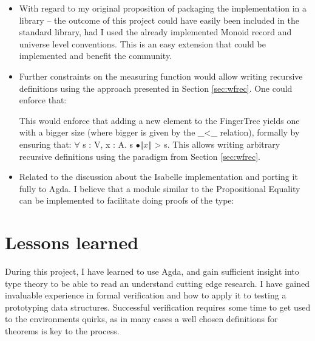 \documentclass[12pt,twoside,notitlepage]{report}
\begin{document}
\begin{itemize}

\item With regard to my original proposition of packaging the implementation in a library -- the outcome of this project could have easily been included in the standard library, had I used the already implemented Monoid record and universe level conventions. This is an easy extension that could be implemented and benefit the community.

\item Further constraints on the measuring function would allow writing recursive definitions using the approach presented in Section \ref{sec:wfrec}. One could enforce that:


\begin{code}
\>[4]\<[6]%
\>[6] \AgdaSymbol{:}     \AgdaBound{>}   \<%
\end{code} 
This would enforce that adding a new element to the FingerTree yields one with a bigger size (where bigger is given by the \_<\_ relation), formally by ensuring that: $\forall$ s : V, x : A. s $∙ \Vert x \Vert$ > s. This allows writing arbitrary recursive definitions using the paradigm from Section \ref{sec:wfrec}.
 
\item Related to the discussion about the Isabelle implementation \cite{isabelle} and porting it fully to Agda. I believe that a module similar to the Propositional Equality can be implemented to facilitate doing proofs of the type:
 
\begin{code} 
   
\end{code} 
\end{itemize}

\section{Lessons learned}

During this project, I have learned to use Agda, and gain sufficient insight into type theory to be able to read an understand cutting edge research. I have gained invaluable experience in formal verification and how to apply it to testing a prototyping data structures. 
Successful verification requires some time to get used to the environments quirks, as in many cases a well chosen definitions for theorems is key to the process. 
\end{document}
